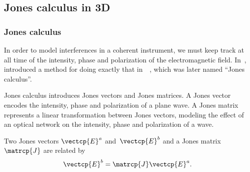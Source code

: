 
\subsection{Jones calculus in 3D}



\subsubsection{Jones calculus}

In order to model interferences in a coherent instrument, we must keep track at all time of the intensity, phase and polarization of the electromagnetic field.
In~\citeyear{jones1941calculus},
\citeauthor{jones1941calculus} introduced a method for doing exactly that in~~\cite{jones1941calculus},
which was later named ``Jones calculus''.

Jones calculus introduces Jones vectors and Jones matrices.
A Jones vector encodes the intensity, phase and polarization of a plane wave.
A Jones matrix represents a linear transformation between Jones vectors, modeling the effect of an optical network on the intensity, phase and polarization of a wave.

Two Jones vectors $\vectcp{E}^a$ and~$\vectcp{E}^b$ and a Jones matrix~$\matrcp{J}$ are related by
\begin{equation}
    \vectcp{E}^b = \matrcp{J} \vectcp{E}^a
    \label{eq:jones_matrix_short}
    \text{.}
\end{equation}

